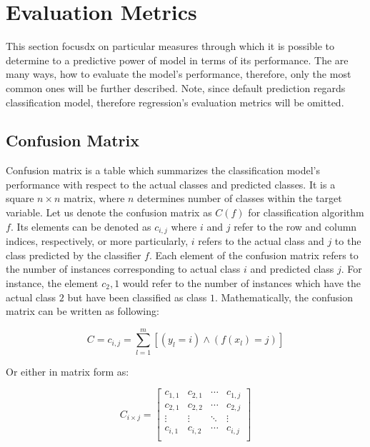 \section{Evaluation Metrics}

This section focusdx on particular measures through which it is possible to determine to a predictive power of model in terms of its performance.
The are many ways, how to evaluate the model's performance, therefore, only the most common ones will be further described.
Note, since default prediction regards classification model, therefore regression's evaluation metrics will be omitted.

\subsection{Confusion Matrix}

Confusion matrix is a table which summarizes the classification model's performance with respect to the actual classes and predicted classes.
It is a square $n \times n$ matrix, where $n$ determines number of classes within the target variable.
Let us denote the confusion matrix as $C\left(f\right)$ for classification algorithm $f$. 
Its elements can be denoted as $c_{i,j}$ where $i$ and $j$ refer to the row and column indices, respectively, or more particularly, $i$ refers to the actual class and $j$ to the class predicted by the classifier $f$.
Each element of the confusion matrix refers to the number of instances corresponding to actual class $i$ and predicted class $j$. For instance, the element $c_2,1$ would refer to the number of instances which have the actual class $2$ but have been classified as class $1$.
Mathematically, the confusion matrix can be written as following:

\begin{equation}\label{eq}
C = {c_{i,j} = \sum_{l=1}^{m}[(y_l=i) \land (f(x_l)=j)]}
\end{equation}

Or either in matrix form as:

\begin{equation}\label{eq}
    C_{i \times j} = \begin{bmatrix}
    c_{1,1} & c_{2,1} & \cdots & c_{1,j} \\
    c_{2,1} & c_{2,2} & \cdots & c_{2,j} \\
    \vdots & \vdots & \ddots & \vdots \\
    c_{i,1} & c_{i,2} & \cdots & c_{i,j} \\
    \end{bmatrix}
\end{equation}

